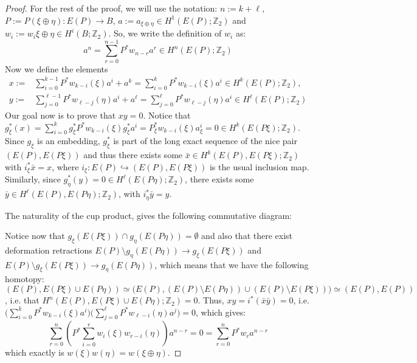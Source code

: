 \begin{proof}
For the rest of the proof, we will use the notation: $n:=k+\ell$, $P:=P(\xi\oplus\eta):E(P)\to B$, $a:=a_{\xi\oplus\eta}\in H^1(E(P);\mathbb{Z}_2)$ and $w_i:=w_i{\xi\oplus\eta}\in H^i(B;\mathbb{Z}_2)$. So, we write the definition of $w_i$ as:
\[a^n=\sum_{r=0}^{n-1}P^*w_{n-r}a^r\in H^n(E(P);\mathbb{Z}_2)\]
Now we define the elements
\begin{align}
x:=&\sum_{i=0}^{k-1}P^*w_{k-i}(\xi)a^i+a^k=\sum_{i=0}^kP^*w_{k-i}(\xi)a^i\in H^k(E(P);\mathbb{Z}_2),\\
y:=&\sum_{j=0}^{\ell-1}P^*w_{\ell-j}(\eta)a^i+a^{\ell}=\sum_{j=0}^{\ell}P^*w_{\ell-j}(\eta)a^i\in H^{\ell}(E(P);\mathbb{Z}_2)
\end{align}
Our goal now is to prove that $xy=0$. Notice that $g_{\xi}^*(x)=\sum_{i=0}^kg_{\xi}^*P^*w_{k-i}(\xi)g_{\xi}^*a^i=P_{\xi}^*w_{k-i}(\xi)a_{\xi}^i=0\in H^k(E(P\xi);\mathbb{Z}_2)$. Since $g_{\xi}$ is an embedding, $g_{\xi}^*$ is part of the long exact sequence of the nice pair $(E(P),E(P\xi))$ and thus there exists some $\bar{x}\in H^k(E(P),E(P\xi);\mathbb{Z}_2)$ with $i_{\xi}^*\bar{x}=x$, where $i_{\xi}:E(P)\hookrightarrow(E(P),E(P\xi))$ is the usual inclusion map. Similarly, since $g_{\eta}^*(y)=0\in H^{\ell}(E(P\eta);\mathbb{Z}_2)$, there exists some $\bar{y}\in H^{\ell}(E(P),E(P\eta);\mathbb{Z}_2)$, with $i_{\eta}^*\bar{y}=y$.

The naturality of the cup product, gives the following commutative diagram:
\begin{center}
\end{center}
Notice now that $g_{\xi}(E(P\xi))\cap g_{\eta}(E(P\eta))=\emptyset$ and also that there exist deformation retractions $E(P)\setminus g_{\eta}(E(P\eta))\to g_{\xi}(E(P\xi))$ and $E(P)\setminus g_{\xi}(E(P\xi))\to g_{\eta}(E(P\eta))$, which means that we have the following homotopy: $(E(P),E(P\xi)\cup E(P\eta))\simeq\big(E(P),(E(P)\setminus E(P\eta))\cup(E(P)\setminus E(P\xi))\big)\simeq(E(P),E(P))$, i.e. that $H^n(E(P),E(P\xi)\cup E(P\eta);\mathbb{Z}_2)=0$. Thus, $xy=i^*(\bar{x}\bar{y})=0$, i.e. $\big(\sum_{i=0}^kP^*w_{k-i}(\xi)a^i\big)\big(\sum_{j=0}^{\ell}P^*w_{\ell-i}(\eta)a^j\big)=0$, which gives:
\[\sum_{r=0}^n\left(P^*\sum_{i=0}^rw_i(\xi)w_{r-i}(\eta)\right)a^{n-r}=0=\sum_{r=0}^nP^*w_ra^{n-r}\]
which exactly is $w(\xi)w(\eta)=w(\xi\oplus\eta)$.
\end{proof}

